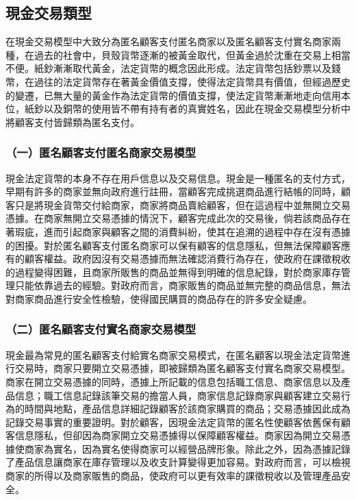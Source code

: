	\subsection{現金交易類型}
	在現金交易模型中大致分為匿名顧客支付匿名商家以及匿名顧客支付實名商家兩種，在過去的社會中，貝殼貨幣逐漸的被黃金取代，但黃金過於沈重在交易上相當不便。紙鈔漸漸取代⿈⾦，法定貨幣的概念因此形成。法定貨幣包括鈔票以及錢幣，在過往的法定貨幣存在著黃金價值支撐，使得法定貨幣具有價值，但經過歷史的變遷，已無⼤量的黃金作為法定貨幣的價值⽀撐，使法定貨幣漸漸地⾛向信⽤本位，紙鈔以及銅幣的使用皆不帶有持有者的真實姓名，因此在現金交易模型分析中將顧客支付皆歸類為匿名支付。

		\subsubsection{（一）匿名顧客支付匿名商家交易模型}
		現金法定貨幣的本身不存在用戶信息以及交易信息。現⾦是一種匿名的支付方式，早期有許多的商家並無向政府進行註冊，當顧客完成挑選商品進行結帳的同時，顧客只是將現金貨幣交付給商家，商家將商品賣給顧客，但在這過程中並無開立交易憑據。在商家無開立交易憑據的情況下，顧客完成此次的交易後，倘若該商品存在著瑕疵，進而引起商家與顧客之間的消費糾紛，使其在追溯的過程中存在沒有憑據的困擾。對於匿名顧客支付匿名商家可以保有顧客的信息隱私，但無法保障顧客應有的顧客權益。政府因沒有交易憑據而無法確認消費行為存在，使政府在課徵稅收的過程變得困難，且商家所販售的商品並無得到明確的信息紀錄，對於商家庫存管理只能依靠過去的經驗。對政府而言，商家販售的商品並無完整的商品信息，無法對商家商品進行安全性檢驗，使得國民購買的商品存在的許多安全疑慮。

		\subsubsection{（二）匿名顧客支付實名商家交易模型}
		現⾦最為常⾒的匿名顧客⽀付給實名商家交易模式，在匿名顧客以現⾦法定貨幣進⾏交易時，商家只要開⽴交易憑據，即被歸類為匿名顧客⽀付實名商家交易模型。商家在開⽴交易憑據的同時，憑據上所記載的信息包括職⼯信息、商家信息以及產品信息；職⼯信息記錄該筆交易的擔當人員，商家信息記錄商家與顧客建立交易行為的時間與地點，產品信息詳細記錄顧客於該商家購買的商品；交易憑據因此成為記錄交易事實的重要證明。對於顧客，因現⾦法定貨幣的匿名性使顧客依舊保有顧客信息隱私，但卻因為商家開⽴交易憑據得以保障顧客權益。商家因為開⽴交易憑據使商家為實名，因為實名使得商家可以經營品牌形象。除此之外，因為憑據記錄了產品信息讓商家在庫存管理以及收支計算變得更加容易。對政府⽽⾔，可以檢視商家的所得以及商家販售的商品，使政府可以更有效率的課徵稅收以及管理產品安全。

